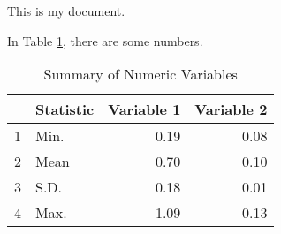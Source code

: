 \documentclass{paper}
\begin{document}
This is my document.

In Table \ref{tab:summary}, there are some numbers. 

\begin{table}[ht]
\centering
\begin{tabular}{rlrr}
  \hline
 & Statistic & Variable 1 & Variable 2 \\ 
  \hline
  1 & Min. & 0.19 & 0.08 \\ 
  2 & Mean & 0.70 & 0.10 \\ 
  3 & S.D. & 0.18 & 0.01 \\ 
  4 & Max. & 1.09 & 0.13 \\ 
   \hline
\end{tabular}
\caption{Summary of Numeric Variables} 
\label{tab:summary}
\end{table}
\end{document}
